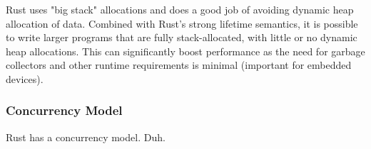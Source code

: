 Rust uses "big stack" allocations 
and does a good job of avoiding dynamic heap allocation of data. Combined with Rust's strong
lifetime semantics, it is possible to write larger programs that are fully stack-allocated, with
little or no dynamic heap allocations. This can significantly boost performance as the need for
garbage collectors and other runtime requirements is minimal (important for embedded devices).



\subsubsection{Concurrency Model} %
\label{ssub:concurrency_model}

Rust has a concurrency model. Duh.




